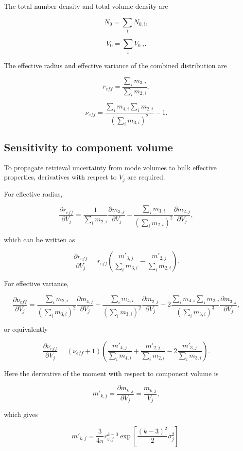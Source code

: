 \documentclass[
  letterpaper,
]{scrbook}
\begin{document}
The total number density and total volume density are

\[
N_0=\sum_i N_{0,i},
\]

\[
V_0=\sum_i V_{0,i}.
\]

The effective radius and effective variance of the combined distribution
are

\[
r_{eff}=\frac{\sum_i m_{3,i}}{\sum_i m_{2,i}},
\]

\[
\nu_{eff}=\frac{\sum_i m_{4,i} \sum_i m_{2,i}}{(\sum_i m_{3,i})^2}-1.
\]

\subsection{Sensitivity to component
volume}\label{sensitivity-to-component-volume}

To propagate retrieval uncertainty from mode volumes to bulk effective
properties, derivatives with respect to \(V_j\) are required.

For effective radius,

\[
\frac{\partial r_{eff}}{\partial V_{j}} =
\frac{1}{\sum_i  m_{2,i}}\frac{\partial m_{3,j}}{\partial V_j}- 
\frac{\sum_i m_{3,i}}{(\sum_i m_{2,i})^2}\frac{\partial m_{2,j}}{\partial V_j},
\]

which can be written as

\[
\frac{\partial r_{eff}}{\partial V_{j}} =
r_{eff} \left(\frac{m'_{3,j}}{\sum_i  m_{3,i}}-\frac{m'_{2,j}}{\sum_i  m_{2,i}}\right).
\]

For effective variance,

\[
\frac{\partial \nu_{eff}}{\partial V_j}=
\frac{\sum_i m_{2,i}}{(\sum_i m_{3,i})^2}\frac{\partial m_{4,j}}{\partial V_j}+
\frac{\sum_i m_{4,i}}{(\sum_i m_{3,i})^2}\frac{\partial m_{2,j}}{\partial V_j}
-2\frac{\sum_i m_{4,i} \sum_i m_{2,i}}{(\sum_i m_{3,i})^3}\frac{\partial m_{3,j}}{\partial V_j},
\]

or equivalently

\[
\frac{\partial \nu_{eff}}{\partial V_j}=
(\nu_{eff}+1) \left(\frac{m'_{4,j}}{\sum_i  m_{4,i}}+\frac{m'_{2,j}}{\sum_i m_{2,i}} 
-2\frac{m'_{3,j}}{\sum_i  m_{3,i}}\right).
\]

Here the derivative of the moment with respect to component volume is

\[
m'_{k,j}=\frac{\partial m_{k,j}}{\partial V_j}=\frac{m_{k,j}}{V_j},
\]

which gives

\[
m'_{k,j}=\frac{3}{4 \pi}
r^{k-3}_{v,j} \exp\left[\frac{(k-3)^2}{2} \sigma_j^2\right].
\]
\end{document}
